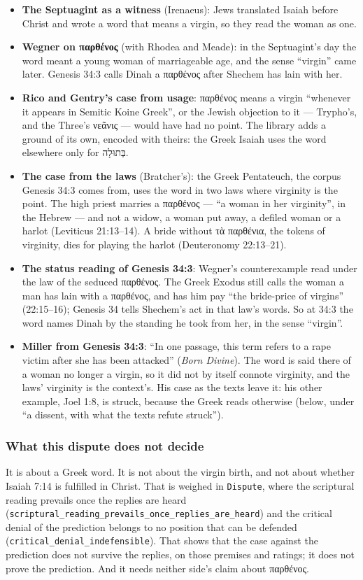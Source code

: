 \documentclass[11pt]{article}
\begin{document}
\begin{itemize}
  \item \textbf{The Septuagint as a witness} (Irenaeus): Jews translated Isaiah before Christ and wrote a word that means a virgin, so they read the woman as one.
  \item \textbf{Wegner on παρθένος} (with Rhodea and Meade): in the Septuagint’s day the word meant a young woman of marriageable age, and the sense “virgin” came later. Genesis 34:3 calls Dinah a παρθένος after Shechem has lain with her.
  \item \textbf{Rico and Gentry’s case from usage}: παρθένος means a virgin “whenever it appears in Semitic Koine Greek”, or the Jewish objection to it — Trypho’s, and the Three’s νεᾶνις — would have had no point. The library adds a ground of its own, encoded with theirs: the Greek Isaiah uses the word elsewhere only for בְּתוּלָה.
  \item \textbf{The case from the laws} (Bratcher’s): the Greek Pentateuch, the corpus Genesis 34:3 comes from, uses the word in two laws where virginity is the point. The high priest marries a παρθένος — “a woman in her virginity”, in the Hebrew — and not a widow, a woman put away, a defiled woman or a harlot (Leviticus 21:13–14). A bride without τὰ παρθένια, the tokens of virginity, dies for playing the harlot (Deuteronomy 22:13–21).
  \item \textbf{The status reading of Genesis 34:3}: Wegner’s counterexample read under the law of the seduced παρθένος. The Greek Exodus still calls the woman a man has lain with a παρθένος, and has him pay “the bride-price of virgins” (22:15–16); Genesis 34 tells Shechem’s act in that law’s words. So at 34:3 the word names Dinah by the standing he took from her, in the sense “virgin”.
  \item \textbf{Miller from Genesis 34:3}: “In one passage, this term refers to a rape victim after she has been attacked” (\emph{Born Divine}). The word is said there of a woman no longer a virgin, so it did not by itself connote virginity, and the laws’ virginity is the context’s. His case as the texts leave it: his other example, Joel 1:8, is struck, because the Greek reads otherwise (below, under “a dissent, with what the texts refute struck”).
\end{itemize}
\subsubsection*{What this dispute does not decide}
It is about a Greek word. It is not about the virgin birth, and not about whether Isaiah 7:14 is fulfilled in Christ. That is weighed in \texttt{Dispute}, where the scriptural reading prevails once the replies are heard (\texttt{scriptural\_\allowbreak{}reading\_\allowbreak{}prevails\_\allowbreak{}once\_\allowbreak{}replies\_\allowbreak{}are\_\allowbreak{}heard}) and the critical denial of the prediction belongs to no position that can be defended (\texttt{critical\_\allowbreak{}denial\_\allowbreak{}indefensible}). That shows that the case against the prediction does not survive the replies, on those premises and ratings; it does not prove the prediction. And it needs neither side’s claim about παρθένος.
\end{document}
